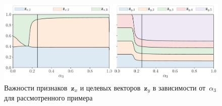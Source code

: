 \documentclass[preprint,12pt]{elsarticle}
\theoremstyle{definition}
\newcommand{\bz}{\mathbf{z}}
\begin{document}
\begin{figure}
	\centering
	\includegraphics[width=\linewidth]{figs/features_vs_alpha.pdf}
	\caption{Важности признаков~$\bz_x$ и целевых векторов~$\bz_y$ в зависимости от~$\alpha_3$ для рассмотренного примера}
	\label{fig:features_vs_alpha}
\end{figure}
\end{document}
